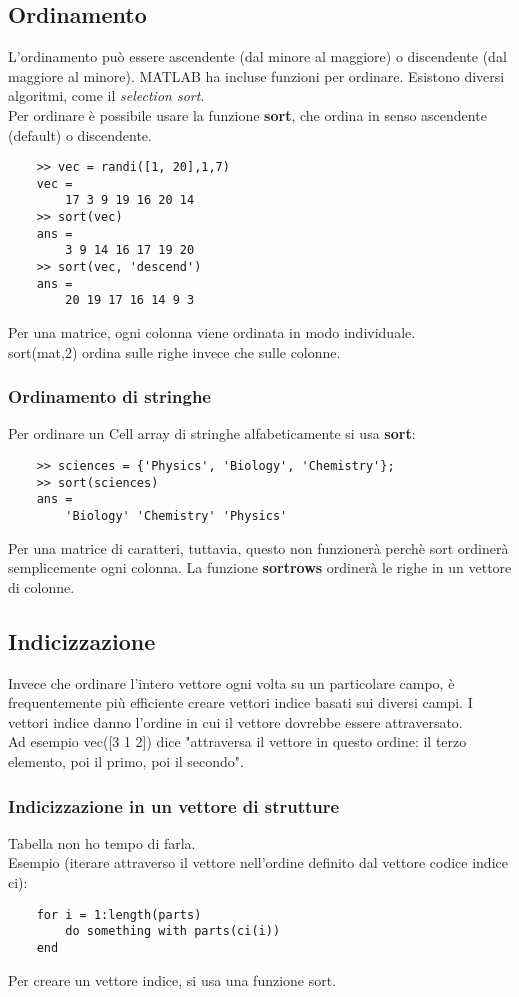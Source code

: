 \documentclass[a4paper, 10pt]{article}
\begin{document}
\subsection{Ordinamento}
L'ordinamento può essere ascendente (dal minore al maggiore) o discendente (dal maggiore al minore). MATLAB ha incluse funzioni per ordinare. Esistono diversi algoritmi, come il \textit{selection sort}.\\
Per ordinare è possibile usare la funzione \textbf{sort}, che ordina in senso ascendente (default) o discendente.
\begin{lstlisting}
	>> vec = randi([1, 20],1,7)
	vec =
		17 3 9 19 16 20 14
	>> sort(vec)
	ans =
		3 9 14 16 17 19 20
	>> sort(vec, 'descend')
	ans =
		20 19 17 16 14 9 3
\end{lstlisting}
Per una matrice, ogni colonna viene ordinata in modo individuale.\\
sort(mat,2) ordina sulle righe invece che sulle colonne.

\subsubsection{Ordinamento di stringhe}
Per ordinare un Cell array di stringhe alfabeticamente si usa \textbf{sort}:
\begin{lstlisting}
	>> sciences = {'Physics', 'Biology', 'Chemistry'};
	>> sort(sciences)
	ans =
		'Biology' 'Chemistry' 'Physics'
\end{lstlisting}
Per una matrice di caratteri, tuttavia, questo non funzionerà perchè sort ordinerà semplicemente ogni colonna.
La funzione \textbf{sortrows} ordinerà le righe in un vettore di colonne. 

\subsection{Indicizzazione}
Invece che ordinare l'intero vettore ogni volta su un particolare campo, è frequentemente più efficiente creare vettori indice basati sui diversi campi. I vettori indice danno l'ordine in cui il vettore dovrebbe essere attraversato.\\
Ad esempio vec([3 1 2]) dice "attraversa il vettore in questo ordine: il terzo elemento, poi il primo, poi il secondo".

\subsubsection{Indicizzazione in un vettore di strutture}
Tabella non ho tempo di farla.\\
Esempio (iterare attraverso il vettore nell'ordine definito dal vettore codice indice ci):
\begin{lstlisting}
	for i = 1:length(parts)
		do something with parts(ci(i))
	end
\end{lstlisting}
Per creare un vettore indice, si usa una funzione sort.
\newpage
\end{document}

